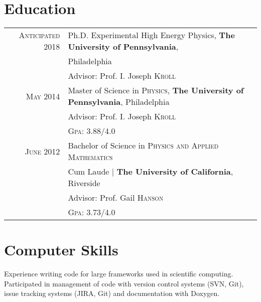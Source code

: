 \documentclass[a4paper,10pt]{article} %
\begin{document}
\section{Education}

\begin{tabular}{rl}
\textsc{Anticipated 2018} & Ph.D. Experimental High Energy Physics, \textbf{The University of Pennsylvania}, \\
                          & Philadelphia \\
&\small Advisor: Prof. I. Joseph \textsc{Kroll}\\
\vspace{1mm}


\textsc{May} 2014 & Master of Science in \textsc{Physics}, \textbf{The University of Pennsylvania}, Philadelphia\\
&\small Advisor: Prof. I. Joseph \textsc{Kroll}\\
&\normalsize \textsc{Gpa}: 3.88/4.0\\
\vspace{1mm}


\textsc{June} 2012& Bachelor of Science in \textsc{}\textsc{Physics and Applied Mathematics} \\
&Cum Laude | \normalsize\textbf{The University of California}, Riverside\\
&\small Advisor: Prof. Gail \textsc{Hanson}\\
&\normalsize \textsc{Gpa}: 3.73/4.0 \\

\end{tabular}
\vspace{0mm}


\section{Computer Skills}

Experience writing code for large frameworks used in scientific computing. Participated
in management of code with version control systems (SVN, Git), issue tracking systems (JIRA, Git)
and documentation with Doxygen.
\end{document}
